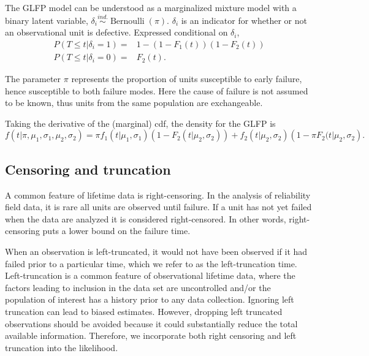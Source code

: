 \documentclass[aap]{imsart}
\newcommand{\ind}{\stackrel{ind.}{\sim}}
\newcommand{\op}{\operatorname}
\begin{document}
The GLFP model can be understood as a marginalized mixture model with a binary latent variable, $\delta_i\ind \op{Bernoulli}(\pi)$. $\delta_i$ is an indicator for whether or not an observational unit is defective. Expressed conditional on $\delta_i$,
\begin{align*}
P(T\le t | \delta_i=1) =& 1 -(1-F_1(t))(1-F_2(t))\\
P(T\le t | \delta_i=0) =& F_2(t).
\end{align*}

 
The parameter $\pi$ represents the proportion of units susceptible to early failure, hence susceptible to both failure modes. Here the cause of failure is not assumed to be known, thus units from the same population are exchangeable.

Taking the derivative of the (marginal) cdf, the density for the GLFP is
\begin{equation}
f(t|\pi, \mu_1,\sigma_1, \mu_2, \sigma_2) = \pi f_1(t|\mu_1,\sigma_1)\left(1-F_2(t|\mu_2,\sigma_2)\right) + f_2(t|\mu_2,\sigma_2)\left(1-\pi F_2(t|\mu_2,\sigma_2\right).
\end{equation}

\subsection{Censoring and truncation}
A common feature of lifetime data is right-censoring. In the analysis of reliability field data, it is rare all units are observed until failure. If a unit has not yet failed when the data are analyzed it is considered right-censored.  In other words, right-censoring puts a lower bound on the failure time.


When an observation is left-truncated, it would not have been observed if it had failed prior to a particular time, which we refer to as the left-truncation time.  Left-truncation is a common feature of observational lifetime data, where the factors leading to inclusion in the data set are uncontrolled and/or the population of interest has a history prior to any data collection. Ignoring left truncation can lead to biased estimates. However, dropping left truncated observations should be avoided because it could substantially reduce the total available information.  Therefore, we incorporate both right censoring and left truncation into the likelihood. 
\end{document}
